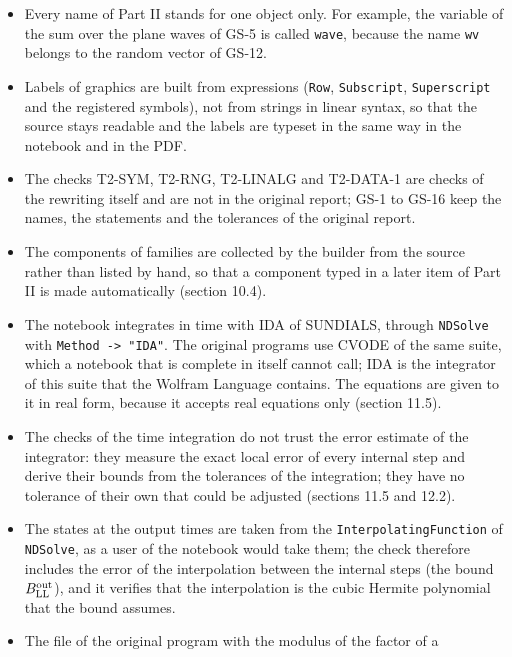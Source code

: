 \documentclass[
  10pt,
]{article}
\begin{document}
\begin{itemize}
  The symbolic algebra \texttt{sym.rs} of the original library is not
  rewritten, because the Wolfram Language is itself a symbolic algebra
  (section 11.4); GS-12 uses symbols of the Wolfram Language instead.
\item
  Every name of Part II stands for one object only. For example, the
  variable of the sum over the plane waves of GS-5 is called
  \texttt{wave}, because the name \texttt{wv} belongs to the random
  vector of GS-12.
\item
  Labels of graphics are built from expressions (\texttt{Row},
  \texttt{Subscript}, \texttt{Superscript} and the registered symbols),
  not from strings in linear syntax, so that the source stays readable
  and the labels are typeset in the same way in the notebook and in the
  PDF.
\item
  The checks T2-SYM, T2-RNG, T2-LINALG and T2-DATA-1 are checks of the
  rewriting itself and are not in the original report; GS-1 to GS-16
  keep the names, the statements and the tolerances of the original
  report.
\item
  The components of families are collected by the builder from the
  source rather than listed by hand, so that a component typed in a
  later item of Part II is made automatically (section 10.4).
\item
  The notebook integrates in time with IDA of SUNDIALS, through
  \texttt{NDSolve} with \texttt{Method\ -\textgreater{}\ "IDA"}. The
  original programs use CVODE of the same suite, which a notebook that
  is complete in itself cannot call; IDA is the integrator of this suite
  that the Wolfram Language contains. The equations are given to it in
  real form, because it accepts real equations only (section 11.5).
\item
  The checks of the time integration do not trust the error estimate of
  the integrator: they measure the exact local error of every internal
  step and derive their bounds from the tolerances of the integration;
  they have no tolerance of their own that could be adjusted (sections
  11.5 and 12.2).
\item
  The states at the output times are taken from the
  \texttt{InterpolatingFunction} of \texttt{NDSolve}, as a user of the
  notebook would take them; the check therefore includes the error of
  the interpolation between the internal steps (the bound
  \(B^{\rm out}_{\rm LL}\)), and it verifies that the interpolation is
  the cubic Hermite polynomial that the bound assumes.
\item
  The file of the original program with the modulus of the factor of a

\end{itemize}
\end{document}
